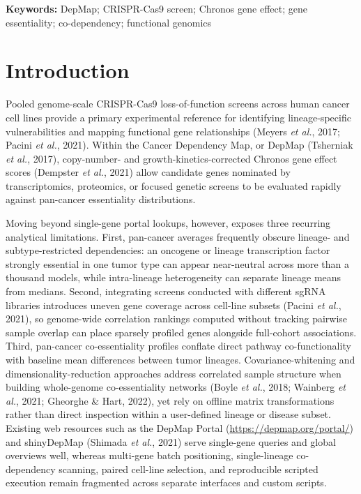 \documentclass[11pt,a4paper]{article}
\begin{document}
\noindent\textbf{Keywords:} DepMap; CRISPR-Cas9 screen; Chronos gene effect; gene essentiality; co-dependency; functional genomics

\section{Introduction}
Pooled genome-scale CRISPR-Cas9 loss-of-function screens across human cancer cell lines provide a primary experimental reference for identifying lineage-specific vulnerabilities and mapping functional gene relationships (Meyers \textit{et al.}, 2017; Pacini \textit{et al.}, 2021). Within the Cancer Dependency Map, or DepMap (Tsherniak \textit{et al.}, 2017), copy-number- and growth-kinetics-corrected Chronos gene effect scores (Dempster \textit{et al.}, 2021) allow candidate genes nominated by transcriptomics, proteomics, or focused genetic screens to be evaluated rapidly against pan-cancer essentiality distributions.

Moving beyond single-gene portal lookups, however, exposes three recurring analytical limitations. First, pan-cancer averages frequently obscure lineage- and subtype-restricted dependencies: an oncogene or lineage transcription factor strongly essential in one tumor type can appear near-neutral across more than a thousand models, while intra-lineage heterogeneity can separate lineage means from medians. Second, integrating screens conducted with different sgRNA libraries introduces uneven gene coverage across cell-line subsets (Pacini \textit{et al.}, 2021), so genome-wide correlation rankings computed without tracking pairwise sample overlap can place sparsely profiled genes alongside full-cohort associations. Third, pan-cancer co-essentiality profiles conflate direct pathway co-functionality with baseline mean differences between tumor lineages. Covariance-whitening and dimensionality-reduction approaches address correlated sample structure when building whole-genome co-essentiality networks (Boyle \textit{et al.}, 2018; Wainberg \textit{et al.}, 2021; Gheorghe \& Hart, 2022), yet rely on offline matrix transformations rather than direct inspection within a user-defined lineage or disease subset. Existing web resources such as the DepMap Portal (\url{https://depmap.org/portal/}) and shinyDepMap (Shimada \textit{et al.}, 2021) serve single-gene queries and global overviews well, whereas multi-gene batch positioning, single-lineage co-dependency scanning, paired cell-line selection, and reproducible scripted execution remain fragmented across separate interfaces and custom scripts.
\end{document}
